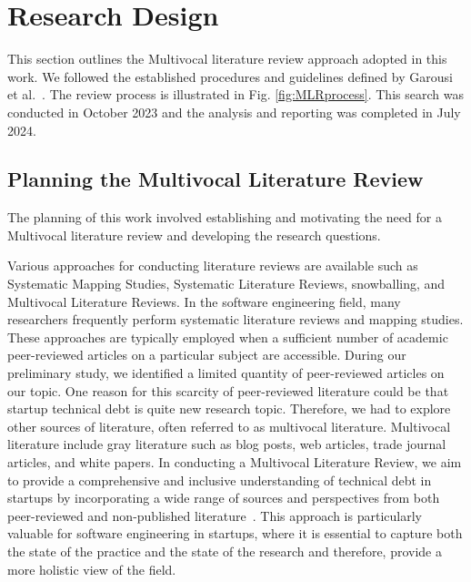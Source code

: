 \section{Research Design}\label{Sec:Research}
This section outlines the Multivocal literature review approach adopted in this
work.
We followed the established procedures and guidelines defined by Garousi et al.~\cite{GAROUSI2019101}. The review process is illustrated in Fig. \ref{fig:MLRprocess}.
This search was conducted in October 2023 and the analysis and reporting was completed in July 2024.

\subsection*{Planning the Multivocal Literature Review}
The planning of this work involved establishing and motivating the need for a Multivocal literature review and developing the research questions.  

Various approaches for conducting literature reviews are available such as Systematic Mapping Studies, Systematic Literature Reviews, snowballing, and Multivocal Literature Reviews.
In the software engineering field, many researchers frequently perform systematic literature reviews and mapping studies.
These approaches are typically employed when a sufficient number of academic peer-reviewed articles on a particular subject are accessible.
During our preliminary study, we identified a limited quantity of peer-reviewed articles on our topic.
One reason for this scarcity of peer-reviewed literature could be that startup technical debt is quite new research topic.
Therefore, we had to explore other sources of literature, often referred to as multivocal literature.
Multivocal literature include gray literature such as blog posts, web articles, trade journal articles, and white papers.
In conducting a Multivocal Literature Review, we aim to provide a comprehensive and inclusive understanding of technical debt in startups by incorporating a wide range of sources and perspectives from both peer-reviewed and non-published literature~\cite{Ogawa91, Garousi2016/2915970.2916008}.
This approach is particularly valuable for software engineering in startups, where it is essential to capture both the state of the practice and the state of the research and therefore, provide a more holistic view of the field. 

